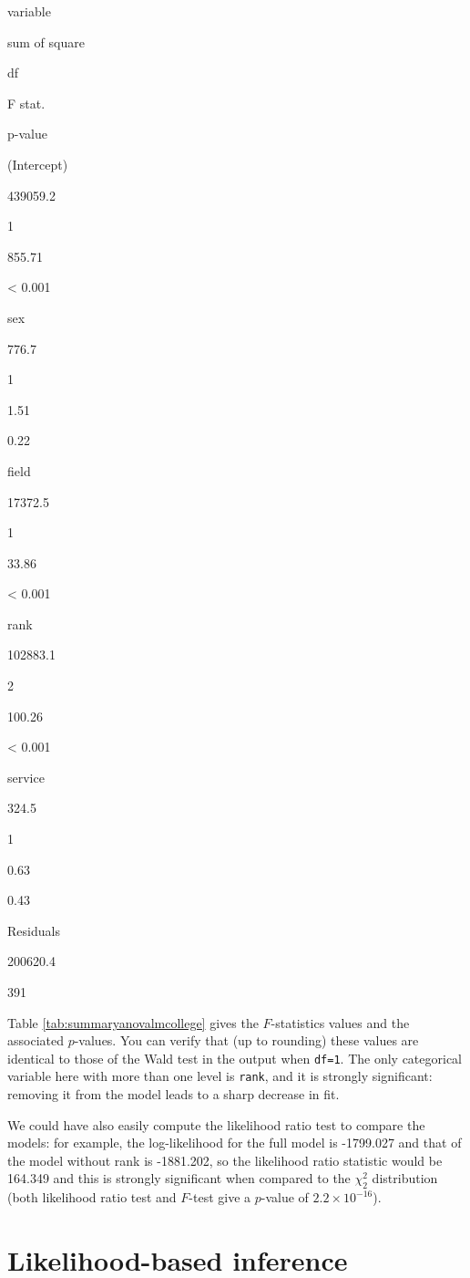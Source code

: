 \documentclass[
  11pt,
  letterpaper,
]{book}
\theoremstyle{definition}
\theoremstyle{definition}
\theoremstyle{definition}
\theoremstyle{remark}
\begin{document}
variable

sum of square

df

F stat.

p-value

(Intercept)

439059.2

1

855.71

\textless{} 0.001

sex

776.7

1

1.51

0.22

field

17372.5

1

33.86

\textless{} 0.001

rank

102883.1

2

100.26

\textless{} 0.001

service

324.5

1

0.63

0.43

Residuals

200620.4

391

Table \ref{tab:summaryanovalmcollege} gives the \(F\)-statistics values and the associated \(p\)-values. You can verify that (up to rounding) these values are identical to those of the Wald test in the output when \texttt{df=1}. The only categorical variable here with more than one level is \texttt{rank}, and it is strongly significant: removing it from the model leads to a sharp decrease in fit.

We could have also easily compute the likelihood ratio test to compare the models: for example, the log-likelihood for the full model is -1799.027 and that of the model without rank is -1881.202, so the likelihood ratio statistic would be 164.349 and this is strongly significant when compared to the \(\chi^2_2\) distribution (both likelihood ratio test and \(F\)-test give a \(p\)-value of \(2.2 \times 10^{-16}\)).

\hypertarget{likelihood}{%
\chapter{Likelihood-based inference}\label{likelihood}}
\end{document}
